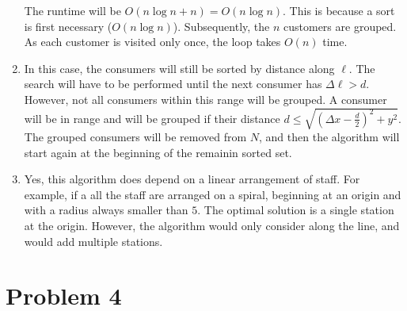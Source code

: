 \documentclass{article}
\begin{document}
\begin{enumerate}[label=\alph*)]
        The runtime will be $O(n \log{n} + n) = O(n \log{n})$.
        This is because a sort is first necessary ($O(n \log{n})$).
        Subsequently, the $n$ customers are grouped.
        As each customer is visited only once, the loop takes $O(n)$ time.

    \item In this case, the consumers will still be sorted by distance along $\ell$.
        The search will have to be performed until the next consumer
        has $\Delta \ell > d$.
        However, not all consumers within this range will be grouped.
        A consumer will be in range and will be grouped if their distance
        $d \leq \sqrt{(\Delta x- \frac{d}{2})^2 + y^2}$.
        The grouped consumers will be removed from $N$, and then the algorithm
        will start again at the beginning of the remainin sorted set.
        
    \item Yes, this algorithm does depend on a linear arrangement of staff.
        For example, if a all the staff are arranged on a spiral, beginning at an origin
        and with a  radius always smaller than $5$. The optimal solution is a single station
        at the origin. However, the algorithm would only consider along the line, and would
        add multiple stations.
\end{enumerate}

\pagebreak
\section{Problem 4}
\end{document}
